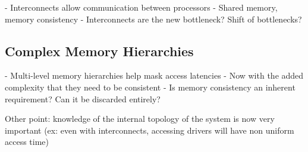 - Interconnects allow communication between processors
- Shared memory, memory consistency
- Interconnects are the new bottleneck? Shift of bottlenecks?

\subsection{Complex Memory Hierarchies}

- Multi-level memory hierarchies help mask access latencies
- Now with the added complexity that they need to be consistent
- Is memory consistency an inherent requirement? Can it be discarded entirely?



Other point: knowledge of the internal topology of the system is
now very important (ex: even with interconnects, accessing
drivers will have non uniform access time)